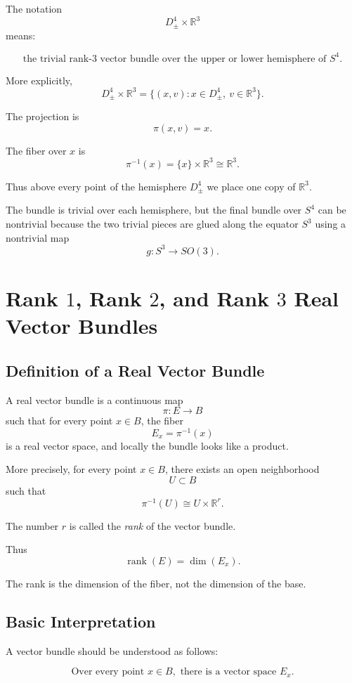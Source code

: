 \documentclass[12pt,a4paper]{article}
\theoremstyle{notespace}
\begin{document}
The notation
\[
D^4_\pm\times \mathbb R^3
\]
means:

\[
\boxed{
	\text{the trivial rank-}3\text{ vector bundle over the upper or lower hemisphere of }S^4.
}
\]

More explicitly,
\[
D^4_\pm\times \mathbb R^3
=
\{(x,v):x\in D^4_\pm,\ v\in \mathbb R^3\}.
\]

The projection is
\[
\pi(x,v)=x.
\]

The fiber over \(x\) is
\[
\pi^{-1}(x)=\{x\}\times \mathbb R^3\cong \mathbb R^3.
\]

Thus above every point of the hemisphere \(D^4_\pm\) we place one copy of \(\mathbb R^3\).

The bundle is trivial over each hemisphere, but the final bundle over \(S^4\) can be nontrivial because the two trivial pieces are glued along the equator \(S^3\) using a nontrivial map
\[
g:S^3\to SO(3).
\]

\section{Rank \(1\), Rank \(2\), and Rank \(3\) Real Vector Bundles}

\subsection{Definition of a Real Vector Bundle}

A real vector bundle is a continuous map
\[
\pi:E\longrightarrow B
\]
such that for every point \(x\in B\), the fiber
\[
E_x=\pi^{-1}(x)
\]
is a real vector space, and locally the bundle looks like a product.

More precisely, for every point \(x\in B\), there exists an open neighborhood
\[
U\subset B
\]
such that
\[
\pi^{-1}(U)\cong U\times \mathbb R^r.
\]

The number \(r\) is called the \emph{rank} of the vector bundle.

Thus
\[
\boxed{
	\operatorname{rank}(E)=\dim(E_x).
}
\]

The rank is the dimension of the fiber, not the dimension of the base.

\subsection{Basic Interpretation}

A vector bundle should be understood as follows:

\[
\boxed{
	\text{Over every point }x\in B,\text{ there is a vector space }E_x.
}
\]
\end{document}
